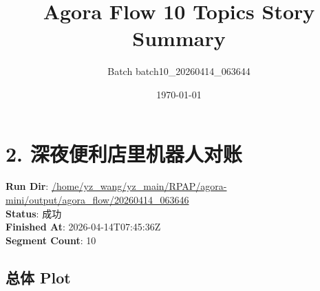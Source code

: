 \documentclass[11pt,a4paper]{article}
\title{Agora Flow 10 Topics Story Summary}
\author{Batch batch10\_20260414\_063644}
\date{\today}
\begin{document}
\maketitle
\tableofcontents

\section{2. 深夜便利店里机器人对账}
\textbf{Run Dir}: \url{/home/yz\_wang/yz\_main/RPAP/agora-mini/output/agora\_flow/20260414\_063646}\\
\textbf{Status}: 成功\\
\textbf{Finished At}: 2026-04-14T07:45:36Z\\
\textbf{Segment Count}: 10

\subsection*{总体 Plot}
\end{document}
